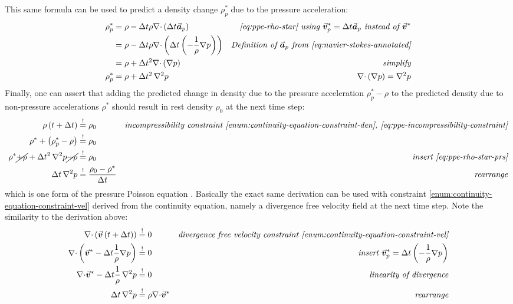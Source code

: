 \documentclass[oneside, a4paper]{book}
\newcommand*\Laplace{\mathop{}\!\mathbin\nabla^2}
\newcommand\vek[1]{\vec{\bm{#1}}}
\newcommand\br[1]{\left(#1\right)}
\newcommand\divergence{{\nabla\cdot}}
\begin{document}
    This same formula can be used to predict a density change $\rho_p^*$ due to the pressure acceleration:
    \begin{align}
      \rho_p^* &= \rho - \Delta t \rho \divergence \br{\Delta t\vek{a}_p} &\textit{\autoref{eq:ppe-rho-star} using $\vek{v}^*_p = \Delta t \vek{a}_p$ instead of $\vek{v}^*$}\\
      &= \rho - \Delta t \rho \divergence \br{\Delta t\br{-\frac{1}{\rho}\nabla p}} &\textit{Definition of $\vek{a}_p$ from \autoref{eq:navier-stokes-annotated}}\\
      &= \rho + \Delta t^2 \divergence \br{\nabla p} &\textit{simplify}\\
      \rho_p^* &= \rho + \Delta t^2 \Laplace p &\textit{$\divergence \br{\nabla p} = \Laplace p$}\label{eq:ppe-rho-star-prs}
    \end{align}
    Finally, one can assert that adding the predicted change in density due to the pressure acceleration $\rho_p^* - \rho$ to the predicted density due to non-pressure accelerations $\rho^*$ should result in rest density $\rho_0$ at the next time step:
    \begin{align}
      \rho\br{t+\Delta t} &\overset{!}{=} \rho_0 &\textit{incompressibility constraint \autoref{enum:continuity-equation-constraint-den}, \autoref{eq:ppe-incompressibility-constraint}}\\
      \rho^* + \br{\rho_p^* - \rho} &\overset{!}{=} \rho_0 &\\
      \rho^* \cancel{+ \rho} + \Delta t^2 \Laplace p \cancel{- \rho} &\overset{!}{=} \rho_0 &\textit{insert \autoref{eq:ppe-rho-star-prs}}\\
      \Delta t \Laplace p &\overset{!}{=}\frac{\rho_0-\rho^*}{\Delta t} &\textit{rearrange}
    \end{align}
    which is one form of the pressure Poisson equation \autocite{tutorial2019}. 
    Basically the exact same derivation can be used with constraint \ref{enum:continuity-equation-constraint-vel} derived from the continuity equation, namely a divergence free velocity field at the next time step. Note the similarity to the derivation above:
    \begin{align}
      \divergence\br{\vek{v}\br{t+\Delta t}} &\overset{!}{=} 0&\textit{divergence free velocity constraint \ref{enum:continuity-equation-constraint-vel}}\\
      \divergence\br{\vek{v}^* - \Delta t \frac{1}{\rho}\nabla p} &\overset{!}{=} 0 &\textit{insert $\vek{v}_p^*=\Delta t \br{- \frac{1}{\rho}\nabla p}$}\\
      \divergence\vek{v}^* - \Delta t \frac{1}{\rho}\Laplace p &\overset{!}{=} 0 & \textit{linearity of divergence}\\
      \Delta t \Laplace p&\overset{!}{=} \rho \divergence\vek{v}^* &\textit{rearrange}
    \end{align}
\end{document}
